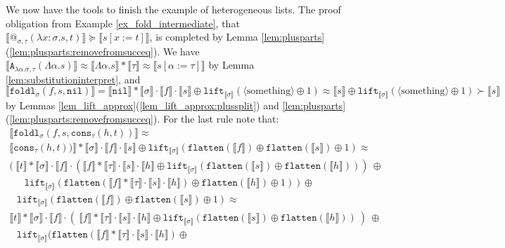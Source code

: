 \documentclass[a4paper,UKenglish,cleveref,autoref,numberwithinsect]{lipics-v2019}
\theoremstyle{definition}
\newcommand{\abs}[2]{\lambda #1.#2}
\newcommand{\tabs}[2]{\Lambda #1.#2}
\newcommand{\flatten}{\mathtt{flatten}}
\newcommand{\lift}{\mathtt{lift}}
\newcommand{\typeinterpret}[1]{\llbracket #1 \rrbracket}
\newcommand{\interpret}[1]{\llbracket #1 \rrbracket}
\newcommand{\nil}{\mathtt{nil}}
\newcommand{\cons}{\mathtt{cons}}
\begin{document}
\begin{example}\label{ex_fold_final}
We now have the tools to finish the example of
heterogeneous lists.  The proof obligation from Example
\ref{ex_fold_intermediate}, that
$\interpret{@_{\sigma,\tau}(\abs{x:\sigma}{s},t)} \succeq
\interpret{s[x:=t]}$, is completed by
Lemma \ref{lem:plusparts}(\ref{lem:plusparts:removefromsucceq}).
We have $\interpret{\mathtt{A}_{\abs{\alpha}{\sigma},
\tau}(\tabs{\alpha}{s})} \approx \interpret{\tabs{\alpha}{s}} *
\typeinterpret{\tau} \approx \interpret{s[\alpha:=\tau]}$ by Lemma
\ref{lem:substitutioninterpret}, and
$\interpret{\mathtt{foldl}_\sigma(f,s,\nil)} =
\interpret{\nil}*\typeinterpret{\sigma} \cdot \interpret{f} \cdot
\interpret{s} \oplus \lift_{\typeinterpret{\sigma}}(\langle
\text{something}\rangle\oplus 1) \approx \interpret{s} \oplus
\lift_{\typeinterpret{\sigma}}(\langle\text{something}\rangle\oplus 1)
\succ \interpret{s}$ by Lemmas
\ref{lem_lift_approx}(\ref{lem_lift_approx:plussplit}) and
\ref{lem:plusparts}(\ref{lem:plusparts:removefromsucceq}).
%
For the last rule note that:
\[
\begin{array}{l}
\interpret{\mathtt{foldl}_\sigma(f,s,\cons_\tau(h,t))} \approx \\
\interpret{\cons_\tau(h,t))} * \typeinterpret{\sigma} \cdot \interpret{f}
\cdot \interpret{s} \oplus \lift_{\typeinterpret{\sigma}}(
\flatten(\interpret{f}) \oplus \flatten(\interpret{s}) \oplus 1) \approx \\
(\ \interpret{t} * \typeinterpret{\sigma} \cdot \interpret{f} \cdot
(\interpret{f} * \typeinterpret{\tau} \cdot \interpret{s}
\cdot \interpret{h} \oplus
\lift_{\typeinterpret{\sigma}}(\flatten(\interpret{s}) \oplus
\flatten(\interpret{h})))\ \oplus \\
\phantom{AB}
\lift_{\typeinterpret{\sigma}}(\flatten(\interpret{f} *
\typeinterpret{\tau} \cdot \interpret{s} \cdot \interpret{h}) \oplus
\flatten(\interpret{h}) \oplus 1)\ )\ \oplus \\
\phantom{A}
 \lift_{\typeinterpret{\sigma}}(\flatten(\interpret{f}) \oplus
 \flatten(\interpret{s}) \oplus 1) \approx \\
\interpret{t} * \typeinterpret{\sigma} \cdot \interpret{f} \cdot
(\ \interpret{f} * \typeinterpret{\tau} \cdot \interpret{s}
\cdot \interpret{h} \oplus 
\lift_{\typeinterpret{\sigma}}(\flatten(\interpret{s}) \oplus
\flatten(\interpret{h}))\ )\ \oplus \\
\phantom{A}
\lift_{\typeinterpret{\sigma}}(\flatten(\interpret{f} * \typeinterpret{
\tau} \cdot \interpret{s} \cdot \interpret{h}) \oplus

\end{array}\]
\end{example}
\end{document}
